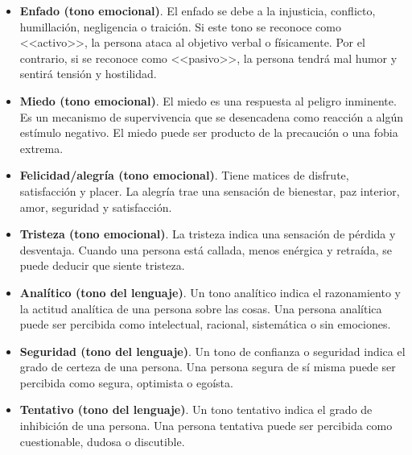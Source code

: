 \begin{itemize}
	\item \textbf{Enfado (tono emocional)}. El enfado se debe a la injusticia, conflicto, humillación, negligencia o traición. Si este tono se reconoce como <<activo>>, la persona ataca al objetivo verbal o físicamente. Por el contrario, si se reconoce como <<pasivo>>, la persona tendrá mal humor y sentirá tensión y hostilidad.
	\item \textbf{Miedo (tono emocional)}. El miedo es una respuesta al peligro inminente. Es un mecanismo de supervivencia que se desencadena como reacción a algún estímulo negativo. El miedo puede ser producto de la precaución o una fobia extrema.
	\item \textbf{Felicidad/alegría (tono emocional)}. Tiene matices de disfrute, satisfacción y placer. La alegría trae una sensación de bienestar, paz interior, amor, seguridad y satisfacción.
	\item \textbf{Tristeza (tono emocional)}. La tristeza indica una sensación de pérdida y desventaja. Cuando una persona está callada, menos enérgica y retraída, se puede deducir que siente tristeza.
	\item \textbf{Analítico (tono del lenguaje)}. Un tono analítico indica el razonamiento y la actitud analítica de una persona sobre las cosas. Una persona analítica puede ser percibida como intelectual, racional, sistemática o sin emociones.
	\item \textbf{Seguridad (tono del lenguaje)}. Un tono de confianza o seguridad indica el grado de certeza de una persona. Una persona segura de sí misma puede ser percibida como segura, optimista o egoísta.
	\item \textbf{Tentativo (tono del lenguaje)}. Un tono tentativo indica el grado de inhibición de una persona. Una persona tentativa puede ser percibida como cuestionable, dudosa o discutible.
\end{itemize}

\clearpage

